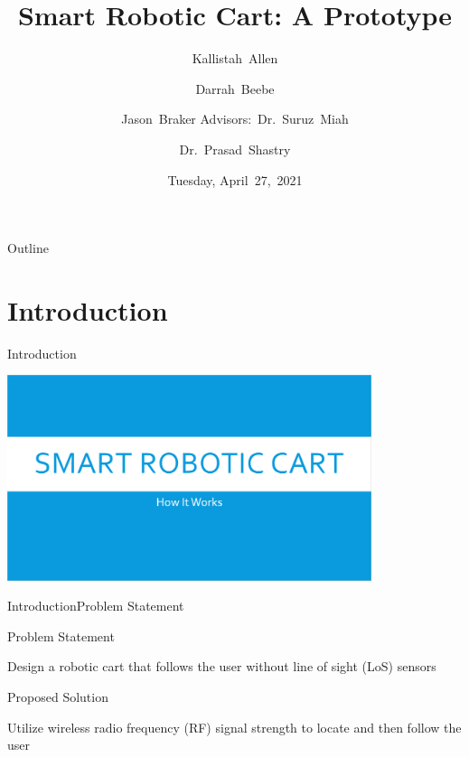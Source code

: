 \documentclass{beamer}
\title[Smart Robotic Cart]{Smart Robotic Cart: A Prototype}
\author[K.~Allen, D.~Beebe, J.~Braker]{Kallistah~Allen \and Darrah~Beebe \and Jason~Braker
Advisors:~Dr.~Suruz~Miah \and Dr.~Prasad~Shastry}
\institute[Bradley University] %
{
  Department of Electrical and Computer Engineering\\
  Bradley University\\
  1501 W. Bradley Avenue\\
  Peoria, IL, 61625, USA
}
\date[April~20,~2021]{Tuesday, April~27,~2021}
\begin{document}
\begin{frame}
  \titlepage
\end{frame}

\begin{frame}{Outline} 
  \tableofcontents%
\end{frame}

\section{Introduction}

\begin{frame}{Introduction}{}
 \begin{center}
    \href{videos/smartRoboticCartIntroVideo.mp4}{\includegraphics[width=0.8\textwidth]{figs/img/finalPresVideoTitle.png}}
  \end{center}
\end{frame}

\begin{frame}{Introduction}{Problem Statement}
  \begin{block}{Problem Statement}
    \begin{LARGE}
      Design a robotic cart that follows the user without line of sight (LoS) sensors
    \end{LARGE}
  \end{block}
  \pause
  \begin{block}{Proposed Solution}
    \begin{LARGE}
      Utilize wireless radio frequency (RF) signal strength to locate and then follow the user
    \end{LARGE}
  \end{block}
\end{frame}

\end{document}
